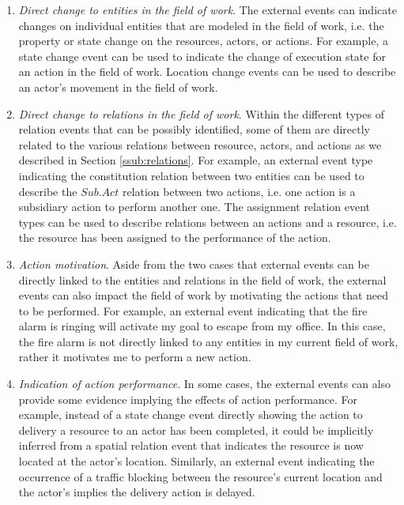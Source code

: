  \begin{enumerate}
 	\item \emph{Direct change to entities in the field of work}. The external events can indicate changes on individual entities that are modeled in the field of work, i.e. the property or state change on the resources, actors, or actions. For example, a state change event can be used to indicate the change of execution state for an action in the field of work. Location change events can be used to describe an actor's movement in the field of work. 
 	\item \emph{Direct change to relations in the field of work}. Within the different types of relation events that can be possibly identified, some of them are directly related to the various relations between resource, actors, and actions as we described in Section \ref{ssub:relations}. For example, an external event type indicating the constitution relation between two entities can be used to describe the $Sub.Act$ relation between two actions, i.e. one action is a subsidiary action to perform another one. The assignment relation event types can be used to describe relations between an actions and a resource, i.e. the resource has been assigned to the performance of the action. 
 	\item \emph{Action motivation}. Aside from the two cases that external events can be directly linked to the entities and relations in the field of work, the external events can also impact the field of work by motivating the actions that need to be performed. For example, an external event indicating that the fire alarm is ringing will activate my goal to escape from my office. In this case, the fire alarm is not directly linked to any entities in my current field of work, rather it motivates me to perform a new action.
 	\item \emph{Indication of action performance}. In some cases, the external events can also provide some evidence implying the effects of action performance. For example, instead of a state change event directly showing the action to delivery a resource to an actor has been completed, it could be implicitly inferred from a spatial relation event that indicates the resource is now located at the actor's location. Similarly, an external event indicating the occurrence of a traffic blocking between the resource's current location and the actor's implies the delivery action is delayed.
 \end{enumerate}

